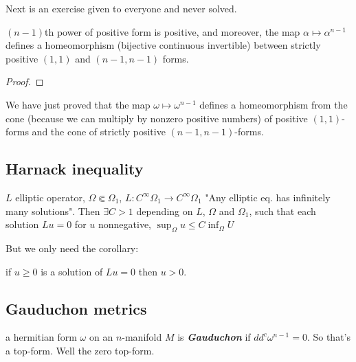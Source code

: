 Next is an exercise given to everyone and never solved.

\begin{claim}\leavevmode
\((n-1)\)th power of positive form is positive, and moreover, the map \(\alpha \mapsto  \alpha^{n-1}\) defines a homeomorphism (bijective continuous invertible) between strictly positive \((1,1)\) and  \((n-1,n-1)\) forms.
\end{claim}

\begin{proof}\leavevmode

\end{proof}

\begin{remark}\leavevmode
We have just proved that the map \(\omega \mapsto  \omega^{n-1}\) defines a homeomorphism from the cone (because we can multiply by nonzero positive numbers) of positive \((1,1)\)-forms and the cone of strictly positive \((n-1,n-1)\)-forms.
\end{remark}

\subsection{Harnack inequality}

\begin{thm}[Harnack]\leavevmode
\(L\) elliptic operator, \(\Omega \Subset \Omega_1\), \(L: C^\infty \Omega_1 \to C^\infty \Omega_1\) "Any elliptic eq. has infinitely many solutions". Then \(\exists  C>1\) depending on \(L\), \(\Omega\) and \(\Omega_1\), such that each solution \(Lu=0\) for  \(u\) nonnegative, \(\operatorname{sup}_{\Omega} u \leq  C \operatorname{inf}_{\Omega}U\)
\end{thm}


But we only need the corollary:

\begin{coro}\leavevmode
if \(u \geq 0\) is a solution of \(Lu=0\) then  \(u>0\).
\end{coro}


\subsection{Gauduchon metrics}

\begin{defn}\leavevmode
a hermitian form \(\omega\) on an \(n\)-manifold \(M\) is \textit{\textbf{Gauduchon}} if \(d d^c \omega^{n-1}=0\). So that's a top-form. Well the zero top-form.
\end{defn}

